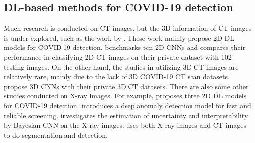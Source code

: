 \documentclass[letterpaper]{article}
\begin{document}




\subsection{DL-based methods for COVID-19 detection}
Much research is conducted on CT images, but the 3D information of CT images is under-explored, such as the work by \cite{He2020,Mobiny2020,Singh2020}. These work mainly propose 2D DL models for COVID-19 detection. \cite{Ardakani2020} benchmarks ten 2D CNNs and compares their performance in classifying 2D CT images on their private dataset with 102 testing images. On the other hand, the studies in utilizing 3D CT images are relatively rare, mainly due to the lack of 3D COVID-19 CT scan datasets. \cite{li2020artificial,Zheng2020} propose 3D CNNs with their private 3D CT datasets. There are also some other studies conducted on X-ray images. For example, \cite{Narin2020} proposes three 2D DL models for COVID-19 detection. \cite{Zhang2020} introduces a deep anomaly detection model for fast and reliable screening. \cite{Ghoshal2020} investigates the estimation of uncertainty and interpretability by Bayesian CNN on the X-ray images. \cite{Alom} uses both X-ray images and CT images to do segmentation and detection. 
\end{document}
